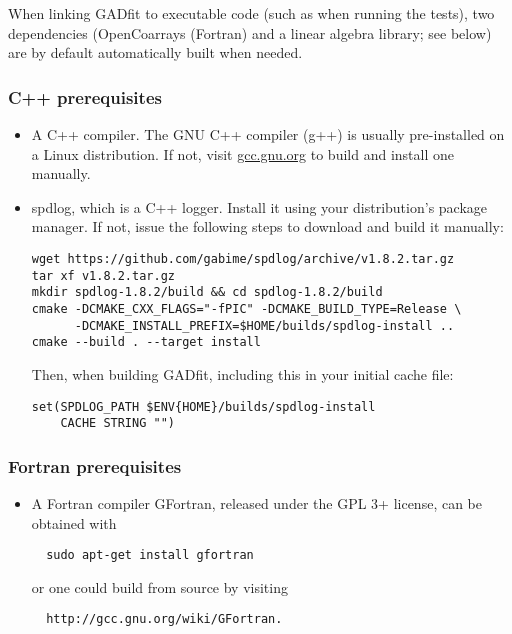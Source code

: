 \documentclass{article}
\begin{document}
When linking GADfit to executable code (such as when running the tests), two dependencies (OpenCoarrays (Fortran) and a linear algebra library; see below) are by default automatically built when needed.

\subsubsection{\label{sec:cxx_prerequisites}C++ prerequisites}

\begin{itemize}
\item A C++ compiler. The GNU C++ compiler (g++) is usually pre-installed on a Linux distribution. If not, visit \url{gcc.gnu.org} to build and install one manually.
\item spdlog, which is a C++ logger. Install it using your distribution's package manager. If not, issue the following steps to download and build it manually:
\begin{verbatim}
wget https://github.com/gabime/spdlog/archive/v1.8.2.tar.gz
tar xf v1.8.2.tar.gz
mkdir spdlog-1.8.2/build && cd spdlog-1.8.2/build
cmake -DCMAKE_CXX_FLAGS="-fPIC" -DCMAKE_BUILD_TYPE=Release \
      -DCMAKE_INSTALL_PREFIX=$HOME/builds/spdlog-install ..
cmake --build . --target install
\end{verbatim}
  Then, when building GADfit, including this in your initial cache file:
\begin{verbatim}
set(SPDLOG_PATH $ENV{HOME}/builds/spdlog-install
    CACHE STRING "")
\end{verbatim}
\end{itemize}

\subsubsection{\label{sec:fortran_prerequisites}Fortran prerequisites}

\begin{itemize}
\item A Fortran compiler
  GFortran, released under the GPL 3+ license, can be obtained with
\begin{verbatim}
  sudo apt-get install gfortran
\end{verbatim}
  or one could build from source by visiting
\begin{verbatim}
  http://gcc.gnu.org/wiki/GFortran.
\end{verbatim}
\end{itemize}
\end{document}
